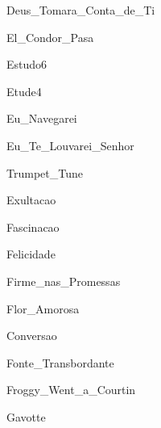 \documentclass{scrartcl}
\begin{document}

{Deus_Tomara_Conta_de_Ti}


{El_Condor_Pasa}


{Estudo6}


{Etude4}


{Eu_Navegarei}


{Eu_Te_Louvarei_Senhor}


{Trumpet_Tune}


{Exultacao}


{Fascinacao}


{Felicidade}


{Firme_nas_Promessas}


{Flor_Amorosa}


{Conversao}


{Fonte_Transbordante}


{Froggy_Went_a_Courtin}


{Gavotte}
\end{document}

